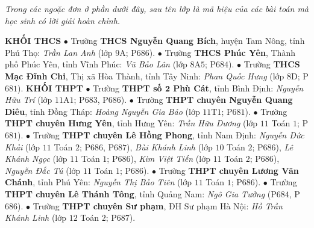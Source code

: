 \textit{Trong các ngoặc đơn ở phần dưới đây, sau tên lớp là mã hiệu của các bài toán mà học sinh có lời giải hoàn chỉnh.}
\begin{multicols}{2}
	\textbf{KHỐI THCS}
	\vskip 0.05cm
	$\bullet$  Trường \textbf{THCS Nguyễn Quang Bích}, huyện Tam Nông, tỉnh Phú Thọ: \textit{Trần Lan Anh} (lớp $9$A; P$686$).
	\vskip 0.05cm
	$\bullet$  Trường \textbf{THCS Phúc Yên}, Thành phố Phúc Yên, tỉnh Vĩnh Phúc: \textit{Vũ Bảo Lân} (lớp $8$A$5$; P$684$).
	\vskip 0.05cm
	$\bullet$  Trường \textbf{THCS Mạc Đĩnh Chi}, Thị xã Hòa Thành, tỉnh Tây Ninh: \textit{Phan Quốc Hưng} (lớp $8$D; P$681$).
	\vskip 0.05cm
	\textbf{KHỐI THPT}
	\vskip 0.05cm
	$\bullet$  Trường \textbf{THPT số $\pmb{2}$ Phù Cát}, tỉnh Bình Định: \textit{Nguyễn Hữu Trí} (lớp $11$A$1$; P$683$, P$686$).
	\vskip 0.05cm
	$\bullet$  Trường \textbf{THPT chuyên Nguyễn Quang Diêu}, tỉnh Đồng Tháp: \textit{Hoàng Nguyễn Gia Bảo} (lớp $11$T$1$; P$681$).
	\vskip 0.05cm
	$\bullet$  Trường \textbf{THPT chuyên Hưng Yên}, tỉnh Hưng Yên: \textit{Trần Hữu Dương} (lớp $11$ Toán $1$; P$681$).
	\vskip 0.05cm
	$\bullet$  Trường \textbf{THPT chuyên Lê Hồng Phong}, tỉnh Nam Định: \textit{Nguyễn Đức Khải} (lớp $11$ Toán $2$; P$686$, P$687$), \textit{Bùi Khánh Linh} (lớp $10$ Toán $2$; P$686$), \textit{Lê Khánh Ngọc} (lớp $11$ Toán $1$; P$686$), \textit{Kim Việt Tiến} (lớp $11$ Toán $2$; P$686$), \textit{Nguyễn Đắc Tú} (lớp $11$ Toán $1$; P$686$).
	\vskip 0.05cm
	$\bullet$  Trường \textbf{THPT chuyên Lương Văn Chánh}, tỉnh Phú Yên: \textit{Nguyễn Thị Bảo Tiên} (lớp $11$ Toán $1$; P$686$).
	\vskip 0.05cm
	$\bullet$  Trường \textbf{THPT chuyên Lê Thánh Tông}, tỉnh Quảng Nam: \textit{Ngô Gia Tưởng} (P$684$, P$686$).
	\vskip 0.05cm
	$\bullet$  Trường \textbf{THPT chuyên Sư phạm}, ĐH Sư phạm Hà Nội: \textit{Hồ Trần Khánh Linh} (lớp $12$ Toán $2$; P$687$).
\end{multicols}
